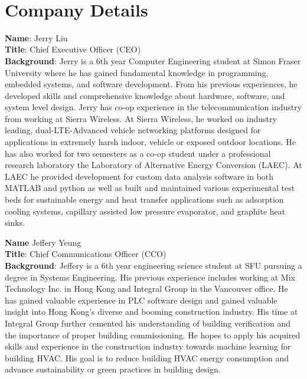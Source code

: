 \
\setcounter{section}{5}
\section{Company Details}

\bigskip
\textbf{Name}: Jerry Liu \\
\medskip
\textbf{Title}: Chief Executive Officer (CEO) \\
\medskip
\textbf{Background}: Jerry is a 6th year Computer Engineering student at Simon Fraser University where he has gained fundamental knowledge in programming, embedded systems, and  software development. From his previous experiences, he developed skills and comprehensive knowledge about hardware, software, and system level design. Jerry has co-op experience in the telecommunication industry from working at Sierra Wireless. At Sierra Wireless, he worked on industry leading, dual-LTE-Advanced vehicle networking platforms designed for applications in extremely harsh indoor, vehicle or exposed outdoor locations. He has also worked for two semesters as a co-op student under a professional research laboratory the Laboratory of Alternative Energy Conversion (LAEC). At LAEC he provided development for custom data analysis software in both MATLAB and python as well as built and maintained various experimental test beds for  sustainable energy and heat transfer applications such as adsorption cooling systems, capillary assisted low pressure evaporator, and graphite heat sinks.

\bigskip
\bigskip
\textbf{Name} Jeffery Yeung \\
\medskip
\textbf{Title}: Chief Communications Officer (CCO)\\
\medskip
\textbf{Background}:
Jeffery is a 6th year engineering science student at SFU pursuing a degree in Systems Engineering. His previous experience includes 
working at Mix Technology Inc. in Hong Kong and Integral Group in the Vancouver office. He has gained valuable experience in PLC software
design and gained valuable insight into Hong Kong's diverse and booming construction industry. His time at Integral Group further cemented
his understanding of building verification and the importance of proper building commissioning. He hopes to apply his acquired skills and experience
in the construction industry towards machine learning for building HVAC. His goal is to reduce building HVAC energy consumption and 
advance sustainability or green practices in building design.

